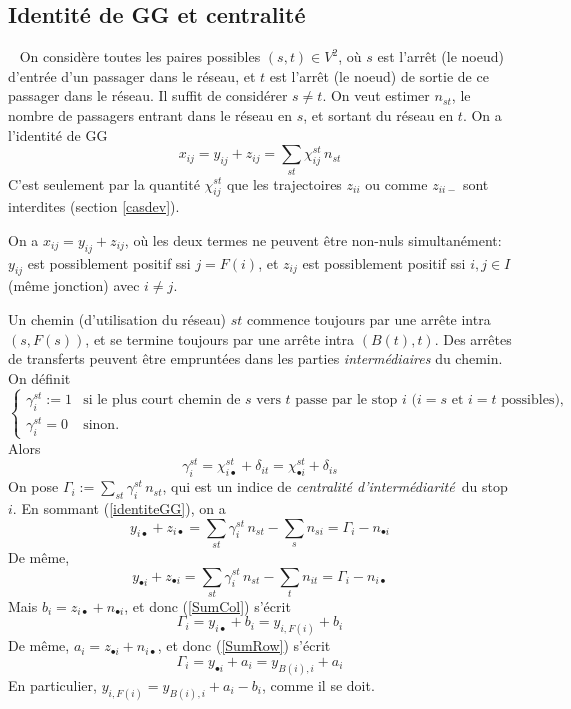 \documentclass{article}
\theoremstyle{plain}
\begin{document}
\subsection{Identité de GG et centralité} 
On considère toutes les paires possibles $(s,t)\in V^2$, où $s$ est l'arrêt (le noeud)  d'entrée d'un passager dans le réseau, et $t$ est l'arrêt (le noeud)  de sortie de ce  passager dans le réseau. Il suffit de considérer $s\neq t$. 
On veut estimer $n_{st}$, le nombre de passagers entrant dans le réseau en $s$, et sortant du réseau en $t$. On a l'identité de GG
\begin{equation}
\label{identiteGG}
x_{ij}=y_{ij}+z_{ij}=\sum_{st}\chi_{ij}^{st}\, n_{st}
\end{equation}
C'est seulement par la quantité $\chi_{ij}^{st}$ que les trajectoires  $z_{ii}$ ou comme $z_{ii-}$ sont interdites (section \ref{casdev}). 

On a $x_{ij}=y_{ij}+z_{ij}$, où les deux termes ne peuvent être non-nuls simultanément: $y_{ij}$ est possiblement positif ssi $j=F(i)$, et $z_{ij}$ est possiblement positif ssi $i,j\in I$ (même jonction) avec $i\neq j$. 


Un chemin (d'utilisation du réseau) $st$ commence toujours par une arrête intra $(s, F(s))$,  et se termine toujours par une arrête intra $(B(t),t)$. Des arrêtes de transferts peuvent être empruntées dans les parties {\em intermédiaires} du chemin.  On définit
\begin{equation}
\label{inter}
\begin{cases}
 \gamma_i^{st}:= 1     & \text{si  le plus court chemin de $s$ vers $t$  passe par le stop $i$ ($i=s$ et $i=t$ possibles),} \\
 \gamma_i^{st}=0         & \text{sinon}.
\end{cases}
\end{equation}
Alors 
\begin{displaymath}
 \gamma_i^{st}=\chi_{i\bullet}^{st}+\delta_{it}=\chi_{\bullet i}^{st}+\delta_{is}
\end{displaymath}
On pose $\Gamma_i:=\sum_{st} \gamma_i^{st}\, n_{st}$, qui est un indice de {\em centralité d'intermédiarité} du stop $i$. 
En sommant (\ref{identiteGG}), on a 
\begin{equation}
\label{SumCol}
y_{i\bullet}+z_{i\bullet}=\sum_{st} \gamma_i^{st}\, n_{st}-\sum_sn_{si}=\Gamma_i-n_{\bullet i}
\end{equation}
De même, 
\begin{equation}
\label{SumRow}
y_{\bullet i}+z_{\bullet i}=\sum_{st} \gamma_i^{st}\, n_{st}-\sum_tn_{it}=\Gamma_i-n_{i\bullet}
\end{equation}
Mais $b_i=z_{i\bullet}+n_{\bullet i}$, et donc (\ref{SumCol}) s'écrit 
\begin{equation}
\label{Gammab}
\Gamma_i=y_{i\bullet}+b_i=y_{i,F(i)}+b_i
\end{equation}
De même, $a_i=z_{\bullet i}+n_{i\bullet}$,  et donc  (\ref{SumRow}) s'écrit 
\begin{equation}
\label{GammaA}
\Gamma_i=y_{\bullet i}+a_i=y_{B(i),i}+a_i
\end{equation}
En particulier, $y_{i,F(i)}=y_{B(i),i}+a_i-b_i$, comme il se doit. 
\end{document}
